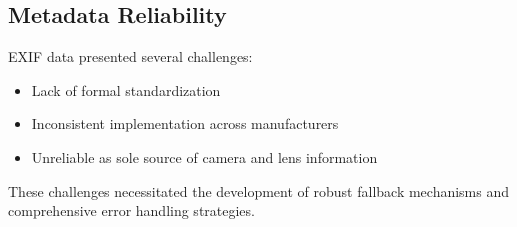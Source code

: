 \subsection{Metadata Reliability}
EXIF data presented several challenges:
\begin{itemize}
    \item Lack of formal standardization
    \item Inconsistent implementation across manufacturers
    \item Unreliable as sole source of camera and lens information
\end{itemize}

These challenges necessitated the development of robust fallback mechanisms and comprehensive error handling strategies.

